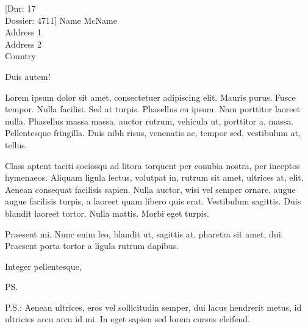 \documentclass{kth-letter}
\begin{document}
\begin{letter}[Dnr: 17\\Dossier: 4711]
              {Name McName\\
               Address 1\\
               Address 2\\
               Country}
\opening{Duis autem!}

Lorem ipsum dolor sit amet, consectetuer adipiscing elit. Mauris
purus. Fusce tempor. Nulla facilisi. Sed at turpis. Phasellus eu
ipsum. Nam porttitor laoreet nulla. Phasellus massa massa, auctor
rutrum, vehicula ut, porttitor a, massa. Pellentesque fringilla. Duis
nibh risus, venenatis ac, tempor sed, vestibulum at, tellus.

Class aptent taciti sociosqu ad litora torquent per conubia nostra,
per inceptos hymenaeos. Aliquam ligula lectus, volutpat in, rutrum sit
amet, ultrices at, elit. Aenean consequat facilisis sapien. Nulla
auctor, wisi vel semper ornare, augue augue facilisis turpis, a
laoreet quam libero quis erat. Vestibulum sagittis. Duis blandit
laoreet tortor. Nulla mattis. Morbi eget turpis.

Praesent mi. Nunc enim leo, blandit ut, sagittis at, pharetra sit
amet, dui. Praesent porta tortor a ligula rutrum dapibus.

\closing{Integer pellentesque,}
\ps

P.S.:
Aenean ultrices, eros vel sollicitudin semper, dui lacus hendrerit
metus, id ultricies arcu arcu id mi. In eget sapien sed lorem cursus
eleifend.

\end{letter}
\end{document}
